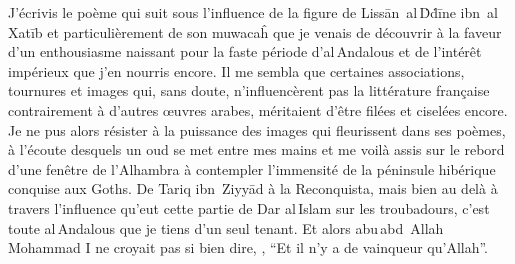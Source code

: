 \begin{prose}
  J’écrivis le poème qui suit sous l’influence de la figure de Lissān~al\,Ḋḋīne ibn~al\,Xatīb et particulièrement de son muwacaĥ  que je venais de découvrir à la faveur d’un enthousiasme naissant pour la faste période d’al\,Andalous et de l’intérêt impérieux que j’en nourris encore. Il me sembla que certaines associations, tournures et images qui, sans doute, n’influencèrent pas la littérature française contrairement à d’autres œuvres arabes, méritaient d’être filées et ciselées encore. Je ne pus alors résister à la puissance des images qui fleurissent dans ses poèmes, à l’écoute desquels un oud se met entre mes mains et me voilà assis sur le rebord d’une fenêtre de l’Alhambra à contempler l’immensité de la péninsule hibérique conquise aux Goths. De Tariq ibn~Ziyyād à la Reconquista, mais bien au delà à travers l’influence qu’eut cette partie de Dar al\,Islam sur les troubadours, c’est toute al\,Andalous que je tiens d’un seul tenant. Et alors abu\,abd~Allah Mohammad {I}\ier{} ne croyait pas si bien dire, , \enquote{Et il n’y a de vainqueur qu’Allah}.

\end{prose}

